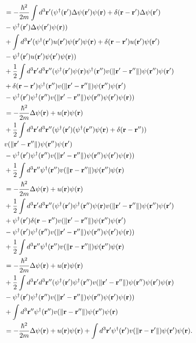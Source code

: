 \documentclass{article}
\begin{document}
\begin{align*}
&=-\frac{\hbar^2}{2m}\int d^3\vb{r}'(\psi^\dagger(\vb{r}')\Delta\psi(\vb{r}')\psi(\vb{r})+\delta(\vb{r}-\vb{r}')\Delta\psi(\vb{r}')\\
&-\psi^\dagger(\vb{r}')\Delta\psi(\vb{r}')\psi(\vb{r}))\\
&+\int d^3\vb{r}'(\psi^\dagger(\vb{r}')u(\vb{r}')\psi(\vb{r}')\psi(\vb{r})+\delta(\vb{r}-\vb{r}')u(\vb{r}')\psi(\vb{r}')\\
&-\psi^\dagger(\vb{r}')u(\vb{r}')\psi(\vb{r}')\psi(\vb{r}))\\
&+\frac{1}{2}\int d^3\vb{r}'d^3\vb{r}''(\psi^\dagger(\vb{r}')\psi(\vb{r})\psi^\dagger(\vb{r}'')v(\|\vb{r}'-\vb{r}''\|)\psi(\vb{r}'')\psi(\vb{r}')\\
&+\delta(\vb{r}-\vb{r}')\psi^\dagger(\vb{r}'')v(\|\vb{r}'-\vb{r}''\|)\psi(\vb{r}'')\psi(\vb{r}')\\
&-\psi^\dagger(\vb{r}')\psi^\dagger(\vb{r}'')v(\|\vb{r}'-\vb{r}''\|)\psi(\vb{r}'')\psi(\vb{r}')\psi(\vb{r}))\\
&=-\frac{\hbar^2}{2m}\Delta\psi(\vb{r})+u(\vb{r})\psi(\vb{r})\\
&+\frac{1}{2}\int d^3\vb{r}'d^3\vb{r}''(\psi^\dagger(\vb{r}')(\psi^\dagger(\vb{r}'')\psi(\vb{r})+\delta(\vb{r}-\vb{r}''))\\
&v(\|\vb{r}'-\vb{r}''\|)\psi(\vb{r}'')\psi(\vb{r}')\\
&-\psi^\dagger(\vb{r}')\psi^\dagger(\vb{r}'')v(\|\vb{r}'-\vb{r}''\|)\psi(\vb{r}'')\psi(\vb{r}')\psi(\vb{r}))\\
&+\frac{1}{2}\int d^3\vb{r}''\psi^\dagger(\vb{r}'')v(\|\vb{r}-\vb{r}''\|)\psi(\vb{r}'')\psi(\vb{r})\\
&=-\frac{\hbar^2}{2m}\Delta\psi(\vb{r})+u(\vb{r})\psi(\vb{r})\\
&+\frac{1}{2}\int d^3\vb{r}'d^3\vb{r}''(\psi^\dagger(\vb{r}')\psi^\dagger(\vb{r}'')\psi(\vb{r})v(\|\vb{r}'-\vb{r}''\|)\psi(\vb{r}'')\psi(\vb{r}')\\
&+\psi^\dagger(\vb{r}')\delta(\vb{r}-\vb{r}'')v(\|\vb{r}'-\vb{r}''\|)\psi(\vb{r}'')\psi(\vb{r}')\\
&-\psi^\dagger(\vb{r}')\psi^\dagger(\vb{r}'')v(\|\vb{r}'-\vb{r}''\|)\psi(\vb{r}'')\psi(\vb{r}')\psi(\vb{r}))\\
&+\frac{1}{2}\int d^3\vb{r}''\psi^\dagger(\vb{r}'')v(\|\vb{r}-\vb{r}''\|)\psi(\vb{r}'')\psi(\vb{r})\\
&=-\frac{\hbar^2}{2m}\Delta\psi(\vb{r})+u(\vb{r})\psi(\vb{r})\\
&+\frac{1}{2}\int d^3\vb{r}'d^3\vb{r}''(\psi^\dagger(\vb{r}')\psi^\dagger(\vb{r}'')v(\|\vb{r}'-\vb{r}''\|)\psi(\vb{r}'')\psi(\vb{r}')\psi(\vb{r})\\
&-\psi^\dagger(\vb{r}')\psi^\dagger(\vb{r}'')v(\|\vb{r}'-\vb{r}''\|)\psi(\vb{r}'')\psi(\vb{r}')\psi(\vb{r}))\\
&+\int d^3\vb{r}''\psi^\dagger(\vb{r}'')v(\|\vb{r}-\vb{r}''\|)\psi(\vb{r}'')\psi(\vb{r})\\
&=-\frac{\hbar^2}{2m}\Delta\psi(\vb{r})+u(\vb{r})\psi(\vb{r})+\int d^3\vb{r}'\psi^\dagger(\vb{r}')v(\|\vb{r}-\vb{r}'\|)\psi(\vb{r}')\psi(\vb{r}).
\end{align*}
\end{document}
